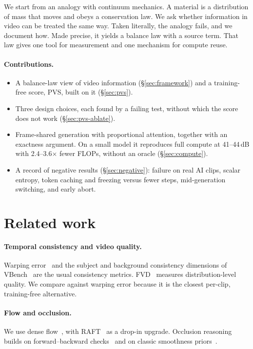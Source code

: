 \documentclass[10pt,twocolumn,letterpaper]{article}
\begin{document}
We start from an analogy with continuum mechanics. A material is a distribution of mass that moves and obeys a conservation law. We ask whether information in video can be treated the same way. Taken literally, the analogy fails, and we document how. Made precise, it yields a balance law with a source term. That law gives one tool for measurement and one mechanism for compute reuse.

\paragraph{Contributions.}
\begin{itemize}
\item A balance-law view of video information (\S\ref{sec:framework}) and a training-free score, PVS, built on it (\S\ref{sec:pvs}).
\item Three design choices, each found by a failing test, without which the score does not work (\S\ref{sec:pvs-ablate}).
\item Frame-shared generation with proportional attention, together with an exactness argument. On a small model it reproduces full compute at 41--44\,dB with 2.4--3.6$\times$ fewer FLOPs, without an oracle (\S\ref{sec:compute}).
\item A record of negative results (\S\ref{sec:negative}): failure on real AI clips, scalar entropy, token caching and freezing versus fewer steps, mid-generation switching, and early abort.
\end{itemize}

\section{Related work}
\paragraph{Temporal consistency and video quality.} Warping error~\cite{lai2018blind} and the subject and background consistency dimensions of VBench~\cite{huang2024vbench} are the usual consistency metrics. FVD~\cite{unterthiner2018fvd} measures distribution-level quality. We compare against warping error because it is the closest per-clip, training-free alternative.
\paragraph{Flow and occlusion.} We use dense flow~\cite{farneback2003two}, with RAFT~\cite{teed2020raft} as a drop-in upgrade. Occlusion reasoning builds on forward--backward checks~\cite{sundaram2010dense} and on classic smoothness priors~\cite{horn1981determining}.
\end{document}
